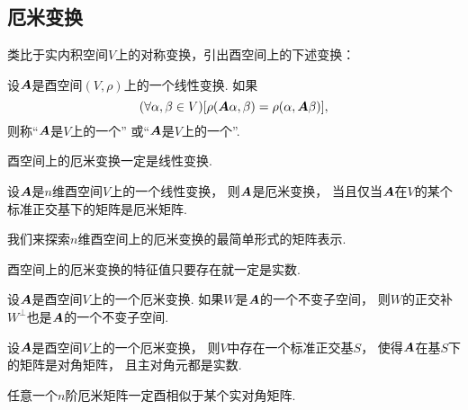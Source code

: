 \subsection{厄米变换}
类比于实内积空间\(V\)上的对称变换，引出酉空间上的下述变换：
\begin{definition}
设\(\boldsymbol{A}\)是酉空间\((V,\rho)\)上的一个线性变换.
如果\begin{equation*}
	(\forall \alpha,\beta \in V)
	[
		\rho(\boldsymbol{A}\alpha,\beta)
		= \rho(\alpha,\boldsymbol{A}\beta)
	],
\end{equation*}
则称“\(\boldsymbol{A}\)是\(V\)上的一个”
或“\(\boldsymbol{A}\)是\(V\)上的一个”.
\end{definition}

\begin{proposition}
酉空间上的厄米变换一定是线性变换.
\end{proposition}

\begin{proposition}
设\(\boldsymbol{A}\)是\(n\)维酉空间\(V\)上的一个线性变换，
则\(\boldsymbol{A}\)是厄米变换，
当且仅当\(\boldsymbol{A}\)在\(V\)的某个标准正交基下的矩阵是厄米矩阵.
\end{proposition}

我们来探索\(n\)维酉空间上的厄米变换的最简单形式的矩阵表示.
\begin{proposition}
酉空间上的厄米变换的特征值只要存在就一定是实数.
\end{proposition}

\begin{proposition}
设\(\boldsymbol{A}\)是酉空间\(V\)上的一个厄米变换.
如果\(W\)是\(\boldsymbol{A}\)的一个不变子空间，
则\(W\)的正交补\(W^\perp\)也是\(\boldsymbol{A}\)的一个不变子空间.
\end{proposition}

\begin{theorem}
设\(\boldsymbol{A}\)是酉空间\(V\)上的一个厄米变换，
则\(V\)中存在一个标准正交基\(S\)，
使得\(\boldsymbol{A}\)在基\(S\)下的矩阵是对角矩阵，
且主对角元都是实数.
\end{theorem}

\begin{corollary}
任意一个\(n\)阶厄米矩阵一定酉相似于某个实对角矩阵.
\end{corollary}
